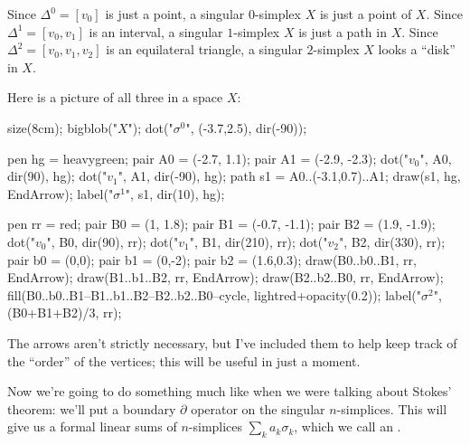 \begin{example}
	\listhack
	\label{ex:simplex}
	\begin{enumerate}[(a)]
		\ii Since $\Delta^0 = [v_0]$ is just a point,
		a singular $0$-simplex $X$ is just a point of $X$.
		\ii Since $\Delta^1 = [v_0, v_1]$ is an interval,
		a singular $1$-simplex $X$ is just a path in $X$.
		\ii Since $\Delta^2 = [v_0, v_1, v_2]$ is an equilateral triangle,
		a singular $2$-simplex $X$ looks a ``disk'' in $X$.
	\end{enumerate}
	Here is a picture of all three in a space $X$:
	\begin{center}
		\begin{asy}
			size(8cm);
			bigblob("$X$");
			dot("$\sigma^0$", (-3.7,2.5), dir(-90));

			pen hg = heavygreen;
			pair A0 = (-2.7, 1.1);
			pair A1 = (-2.9, -2.3);
			dot("$v_0$", A0, dir(90), hg);
			dot("$v_1$", A1, dir(-90), hg);
			path s1 = A0..(-3.1,0.7)..A1;
			draw(s1, hg, EndArrow);
			label("$\sigma^1$", s1, dir(10), hg);

			pen rr = red;
			pair B0 = (1, 1.8);
			pair B1 = (-0.7, -1.1);
			pair B2 = (1.9, -1.9);
			dot("$v_0$", B0, dir(90), rr);
			dot("$v_1$", B1, dir(210), rr);
			dot("$v_2$", B2, dir(330), rr);
			pair b0 = (0,0);
			pair b1 = (0,-2);
			pair b2 = (1.6,0.3);
			draw(B0..b0..B1, rr, EndArrow);
			draw(B1..b1..B2, rr, EndArrow);
			draw(B2..b2..B0, rr, EndArrow);
			fill(B0..b0..B1--B1..b1..B2--B2..b2..B0--cycle, lightred+opacity(0.2));
			label("$\sigma^2$", (B0+B1+B2)/3, rr);
		\end{asy}
	\end{center}
	The arrows aren't strictly necessary, but I've included them
	to help keep track of the ``order'' of the vertices;
	this will be useful in just a moment.
\end{example}

Now we're going to do something much like
when we were talking about Stokes' theorem:
we'll put a boundary $\partial$ operator on the singular $n$-simplices.
This will give us a formal linear sums of $n$-simplices $\sum_k a_k \sigma_k$,
which we call an .

